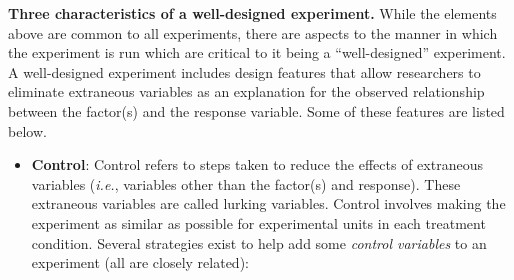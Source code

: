 \documentclass[
]{book}
\begin{document}
\textbf{Three characteristics of a well-designed experiment.} While the elements above are common to all experiments, there are aspects to the manner in which the experiment is run which are critical to it being a ``well-designed'' experiment.
A well-designed experiment includes design features that allow researchers to eliminate extraneous variables as an explanation for the observed relationship between the factor(s) and the response variable. Some of these features are listed below.

\begin{itemize}
\item
  \textbf{Control}: Control refers to steps taken to reduce the effects of extraneous variables (\emph{i.e.}, variables other than the factor(s) and response).
  These extraneous variables are called lurking variables.
  Control involves making the experiment as similar as possible for experimental units in each treatment condition.
  Several strategies exist to help add some \emph{control variables} to an experiment (all are closely related):


\end{itemize}
\end{document}
